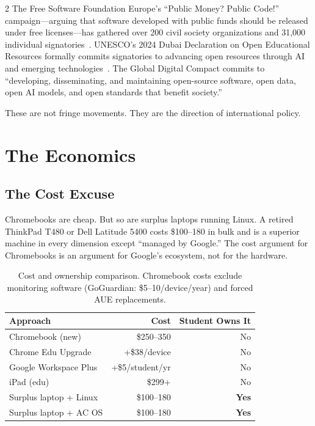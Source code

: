 \documentclass[11pt, a4paper]{article}
\begin{document}
\begin{multicols}{2}
The Free Software Foundation Europe's ``Public Money? Public Code!'' campaign---arguing that software developed with public funds should be released under free licenses---has gathered over 200 civil society organizations and 31,000 individual signatories~\citep{fsfe2024publiccode}. UNESCO's 2024 Dubai Declaration on Open Educational Resources formally commits signatories to advancing open resources through AI and emerging technologies~\citep{unesco2024oer}. The Global Digital Compact commits to ``developing, disseminating, and maintaining open-source software, open data, open AI models, and open standards that benefit society.''

These are not fringe movements. They are the direction of international policy.


\section{The Economics}

\subsection{The Cost Excuse}

Chromebooks are cheap. But so are surplus laptops running Linux. A retired ThinkPad T480 or Dell Latitude 5400 costs \$100--180 in bulk and is a superior machine in every dimension except ``managed by Google.'' The cost argument for Chromebooks is an argument for Google's ecosystem, not for the hardware.

\begin{table}[H]
\small
\centering
\begin{tabular}{lrr}
\toprule
\textbf{Approach} & \textbf{Cost} & \textbf{Student Owns It} \\
\midrule
Chromebook (new) & \$250--350 & No \\
Chrome Edu Upgrade & +\$38/device & No \\
Google Workspace Plus & +\$5/student/yr & No \\
iPad (edu) & \$299+ & No \\
\midrule
Surplus laptop + Linux & \$100--180 & \textbf{Yes} \\
Surplus laptop + AC OS & \$100--180 & \textbf{Yes} \\
\bottomrule
\end{tabular}
\caption{Cost and ownership comparison. Chromebook costs exclude monitoring software (GoGuardian: \$5--10/device/year) and forced AUE replacements.}
\label{tab:cost}
\end{table}


\end{multicols}
\end{document}

